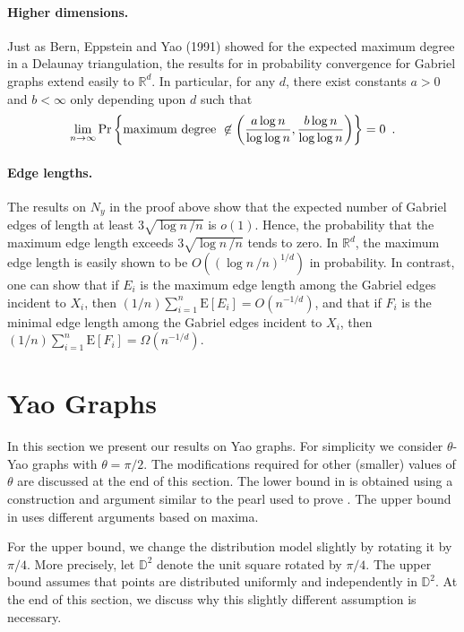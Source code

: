 \documentclass[10pt]{llncs}
\newcommand{\RR}{\mathbb{R}}
\newcommand{\D}{\mathbb{D}}
\newcommand{\PROB}{\Pr}
\newcommand{\EXP}{\mathrm{E}}
\begin{document}
\paragraph{Higher dimensions.}
Just as Bern, Eppstein and Yao (1991) showed for the
expected maximum degree in a Delaunay triangulation, 
the results for in probability convergence for Gabriel graphs
extend easily to $\RR^d$. In particular,
for any $d$, there exist constants $a>0$ and $b < \infty$ 
only depending upon $d$ such that
\[
\lim_{n\to\infty} \PROB \left\{ \hbox{\rm maximum degree}~\not\in 
  \left( {a \log n \over \log \log n} , { b \log n \over \log \log n} \right)
  \right\} = 0 \enspace .
\]

\paragraph{Edge lengths.}
The results on $N_y$ in the proof above
show that the expected number of Gabriel
edges of length at least $3 \sqrt{\log n \,/n}$
is $o(1)$. Hence, the probability that the maximum edge
length exceeds $3 \sqrt{\log n \,/n}$ tends to zero.
In $\RR^d$, the maximum edge length is
easily shown to be $O((\log n \,/n)^{1/d})$ in
probability.
In contrast, one can show that if $E_i$ is the
maximum edge length among the Gabriel edges incident to $X_i$,
then $(1/n) \sum_{i=1}^n \EXP[E_i]= O(n^{-1/d})$,
and that if 
$F_i$ is the
minimal edge length among the Gabriel edges incident to $X_i$,
then $(1/n) \sum_{i=1}^n \EXP[F_i]= \Omega (n^{-1/d})$. 

\section{Yao Graphs}

In this section we present our results on Yao graphs.  For simplicity
we consider $\theta$-Yao graphs with $\theta=\pi/2$.  The modifications
required for other (smaller) values of $\theta$ are discussed at the end
of this section.  The lower bound in  is obtained
using a construction and argument similar to the pearl used to prove
.  The upper bound in 
uses different arguments based on maxima.

For the upper bound, we change the distribution model slightly by rotating
it by $\pi/4$.  More precisely, let $\D^2$ denote the unit square rotated
by $\pi/4$.  The upper bound assumes that points are distributed uniformly
and independently in $\D^2$. At the end of this section, we discuss why
this slightly different assumption is necessary.
\end{document}
